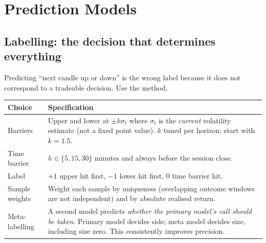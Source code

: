 \chapter{Prediction Models}
\label{ch:ml}

\section{Labelling: the decision that determines everything}

Predicting ``next candle up or down'' is the wrong label because it does not
correspond to a tradeable decision. Use the  method.

\begin{center}
\end{center}

\begin{longtable}{@{}p{3.6cm}p{11.0cm}@{}}
\toprule
\textbf{Choice} & \textbf{Specification}\\
\midrule
Barriers & Upper and lower at $\pm k\sigma_t$ where $\sigma_t$ is the
\emph{current} volatility estimate (not a fixed point value). $k$ tuned per
horizon; start with $k=1.5$.\\
Time barrier & $h \in \{5, 15, 30\}$ minutes and always before the session close.\\
Label & $+1$ upper hit first, $-1$ lower hit first, $0$ time barrier hit.\\
Sample weights & Weight each sample by uniqueness (overlapping outcome windows
are not independent) and by absolute realised return.\\
Meta-labelling & A second model predicts \emph{whether the primary model's call
should be taken}. Primary model decides side; meta model decides size, including
size zero. This consistently improves precision.\\
\bottomrule
\end{longtable}

